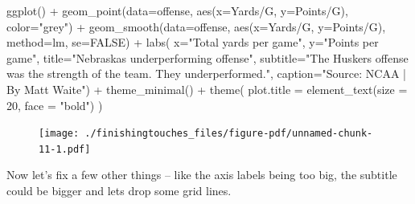 \documentclass[
  letterpaper,
  DIV=11,
  numbers=noendperiod]{scrreprt}
\newenvironment{Shaded}{\begin{snugshade}}{\end{snugshade}}
\newcommand{\AttributeTok}[1]{\textcolor[rgb]{0.40,0.45,0.13}{#1}}
\newcommand{\ConstantTok}[1]{\textcolor[rgb]{0.56,0.35,0.01}{#1}}
\newcommand{\DecValTok}[1]{\textcolor[rgb]{0.68,0.00,0.00}{#1}}
\newcommand{\FunctionTok}[1]{\textcolor[rgb]{0.28,0.35,0.67}{#1}}
\newcommand{\NormalTok}[1]{\textcolor[rgb]{0.00,0.23,0.31}{#1}}
\newcommand{\SpecialCharTok}[1]{\textcolor[rgb]{0.37,0.37,0.37}{#1}}
\newcommand{\StringTok}[1]{\textcolor[rgb]{0.13,0.47,0.30}{#1}}
\begin{document}
\begin{Shaded}
\begin{Highlighting}[]
\FunctionTok{ggplot}\NormalTok{() }\SpecialCharTok{+} 
  \FunctionTok{geom\_point}\NormalTok{(}\AttributeTok{data=}\NormalTok{offense, }\FunctionTok{aes}\NormalTok{(}\AttributeTok{x=}\StringTok{\textasciigrave{}}\AttributeTok{Yards/G}\StringTok{\textasciigrave{}}\NormalTok{, }\AttributeTok{y=}\StringTok{\textasciigrave{}}\AttributeTok{Points/G}\StringTok{\textasciigrave{}}\NormalTok{), }\AttributeTok{color=}\StringTok{"grey"}\NormalTok{) }\SpecialCharTok{+} 
  \FunctionTok{geom\_smooth}\NormalTok{(}\AttributeTok{data=}\NormalTok{offense, }\FunctionTok{aes}\NormalTok{(}\AttributeTok{x=}\StringTok{\textasciigrave{}}\AttributeTok{Yards/G}\StringTok{\textasciigrave{}}\NormalTok{, }\AttributeTok{y=}\StringTok{\textasciigrave{}}\AttributeTok{Points/G}\StringTok{\textasciigrave{}}\NormalTok{), }\AttributeTok{method=}\NormalTok{lm, }\AttributeTok{se=}\ConstantTok{FALSE}\NormalTok{) }\SpecialCharTok{+} 
  \FunctionTok{labs}\NormalTok{(}
    \AttributeTok{x=}\StringTok{"Total yards per game"}\NormalTok{, }
    \AttributeTok{y=}\StringTok{"Points per game"}\NormalTok{, }
    \AttributeTok{title=}\StringTok{"Nebraska\textquotesingle{}s underperforming offense"}\NormalTok{, }
    \AttributeTok{subtitle=}\StringTok{"The Husker\textquotesingle{}s offense was the strength of the team. They underperformed."}\NormalTok{,}
    \AttributeTok{caption=}\StringTok{"Source: NCAA | By Matt Waite"}\NormalTok{) }\SpecialCharTok{+} 
  \FunctionTok{theme\_minimal}\NormalTok{() }\SpecialCharTok{+} 
  \FunctionTok{theme}\NormalTok{(}
    \AttributeTok{plot.title =} \FunctionTok{element\_text}\NormalTok{(}\AttributeTok{size =} \DecValTok{20}\NormalTok{, }\AttributeTok{face =} \StringTok{"bold"}\NormalTok{)}
\NormalTok{    ) }
\end{Highlighting}
\end{Shaded}

\begin{figure}[H]

{\centering \texttt{[image: ./finishingtouches\_files/figure-pdf/unnamed-chunk-11-1.pdf]}

}

\end{figure}

Now let's fix a few other things -- like the axis labels being too big,
the subtitle could be bigger and lets drop some grid lines.
\end{document}

